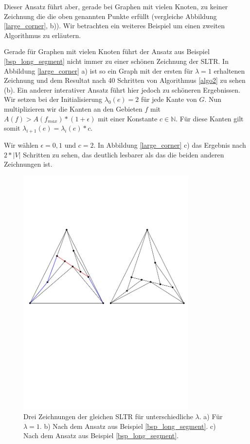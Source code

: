Dieser Ansatz führt aber, gerade bei Graphen mit vielen Knoten, zu keiner Zeichnung die die oben genannten Punkte erfüllt (vergleiche Abbildung \ref{large_corner}, b)). Wir betrachten ein weiteres Beispiel um einen zweiten Algorithmus zu erläutern.

\begin{example}\label{bsp_large_corner} 
Gerade für Graphen mit vielen Knoten führt der Ansatz aus Beispiel \ref{bsp_long_segment} nicht immer zu einer schönen Zeichnung der SLTR. In Abbildung \ref{large_corner} a) ist so ein Graph mit der ersten für $\lambda=1$ erhaltenen Zeichnung und dem Resultat nach 40 Schritten von Algorithmus \ref{algo2} zu sehen (b). Ein anderer interativer Ansatz führt hier jedoch zu schöneren Ergebnissen. Wir setzen bei der Initialisierung $\lambda_0(e)=2$ für jede Kante von $G$. Nun multiplizieren wir die Kanten an den Gebieten $f$ mit $A(f) > A(f_{max})*(1+\epsilon)$ mit einer Konstante $c \in \mathbb{N}$. Für diese Kanten gilt somit $\lambda_{i+1}(e) = \lambda_{i}(e)*c$. 

Wir wählen $\epsilon = 0,1$ und $c=2$. In Abbildung \ref{large_corner} c) das Ergebnis nach $2*|V|$ Schritten zu sehen, das deutlich lesbarer als das die beiden anderen Zeichnungen ist.

\end{example}

\begin{figure}[h]
	\centering
  \includegraphics[width=0.8\textwidth]{example1_vis.pdf}
  \caption{Drei Zeichnungen der gleichen SLTR für unterschiedliche $\lambda$. a) Für $\lambda=1$. b) Nach dem Ansatz aus Beispiel \ref{bsp_long_segment}. c) Nach dem Ansatz aus Beispiel \ref{bsp_long_segment}.}
  \label{long_segment}
\end{figure}

